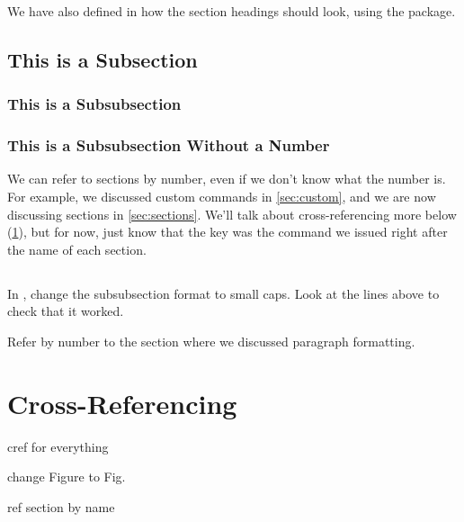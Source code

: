 \documentclass{article}
\begin{document}
We have also defined in  how the section headings should look, using the  package.

\subsection{This is a Subsection}

\subsubsection{This is a Subsubsection}

\subsubsection*{This is a Subsubsection Without a Number}

We can refer to sections by number, even if we don't know what the number is.
For example, we discussed custom commands in \cref{sec:custom}, and we are now discussing sections in \cref{sec:sections}.
We'll talk about cross-referencing more below (\cref{sec:refs}), but for now, just know that the key was the \latexcode{\\label} command we issued right after the name of each section.

\subsection{\task}

In , change the subsubsection format to small caps.
Look at the lines above to check that it worked.

Refer by number to the section where we discussed paragraph formatting.


\section{Cross-Referencing}
\label{sec:refs}

cref for everything

change Figure to Fig.

ref section by name
\end{document}
